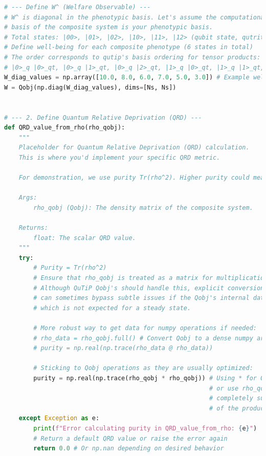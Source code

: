 \documentclass[9pt]{article}
\begin{document}
\begin{lstlisting}[language=Python, basicstyle=\ttfamily\footnotesize, breaklines=true, frame=single, caption={Python Code for Stability Analysis of Quantum Subsystem}, label={lst:qrd_code}]
# --- Define W^ (Welfare Observable) ---
# W^ is diagonal in the phenotypic basis. Let's assume the computational
# basis of the composite system is your phenotypic basis.
# Total states: |00>, |01>, |02>, |10>, |11>, |12> (qubit state, qutrit state)
# Define well-being for each composite phenotype (6 states in total)
# The order corresponds to qutip's basis ordering for tensor products:
# |0>_q |0>_qt, |0>_q |1>_qt, |0>_q |2>_qt, |1>_q |0>_qt, |1>_q |1>_qt, |1>_q |2>_qt
W_diag_values = np.array([10.0, 8.0, 6.0, 7.0, 5.0, 3.0]) # Example well-being values
W = Qobj(np.diag(W_diag_values), dims=[Ns, Ns])


# --- 2. Define Quantum Relative Deprivation (QRD) ---
def QRD_value_from_rho(rho_qobj):
    """
    Placeholder for Quantum Relative Deprivation (QRD) calculation.
    This is where you'd implement your specific QRD metric.

    For demonstration, we use purity Tr(rho^2). Higher purity could mean lower "deprivation".

    Args:
        rho_qobj (Qobj): The density matrix of the composite system.

    Returns:
        float: The scalar QRD value.
    """
    try:
        # Purity = Tr(rho^2)
        # Ensure that rho_qobj is treated as a matrix for multiplication
        # Although QuTiP Qobj's should handle this, explicit conversion to dense array
        # can sometimes bypass subtle issues if the Qobj's internal data is weirdly structured
        # which is not expected for a steady state.
        
        # More robust way to get data for numpy operations if needed:
        # rho_data = rho_qobj.full() # Convert Qobj to a dense numpy array
        # purity = np.real(np.trace(rho_data @ rho_data))
        
        # Sticking to Qobj operations as they are usually optimized:
        purity = np.real(np.trace(rho_qobj * rho_qobj)) # Using * for Qobj @ Qobj in newer QuTiP versions
                                                        # or use rho_qobj.dag() * rho_qobj if you want to be
                                                        # completely sure about Hermiticity and positive-definiteness
                                                        # of the product. For purity, rho*rho is standard.
    except Exception as e:
        print(f"Error calculating purity in QRD_value_from_rho: {e}")
        # Return a default QRD value or raise the error again
        return 0.0 # Or np.nan depending on desired behavior


\end{lstlisting}
\end{document}
